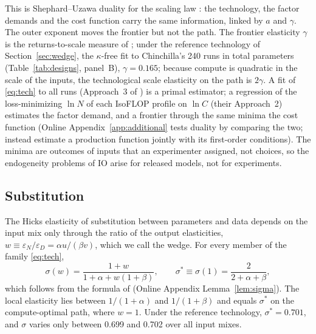 This is Shephard--Uzawa duality for the scaling law \citep{shephard1953cost,uzawa1964duality}: the technology, the
factor demands and the cost function carry the same information, linked by $a$ and $\gamma$. The outer exponent moves
the frontier but not the path. The frontier elasticity $\gamma$ is the returns-to-scale measure of
\citet{nerlove1963returns}; under the reference technology of Section~\ref{sec:wedge}, the $\kappa$-free fit to Chinchilla's 240 runs in
total parameters (Table~\ref{tab:designs}, panel~B), $\gamma=0.165$; because compute is quadratic in the scale of the
inputs, the technological scale elasticity on the path is $2\gamma$. A fit of \eqref{eq:tech} to all runs (Approach~3 of \citealp{hoffmann2022training}) is a
primal estimator; a regression of the loss-minimizing $\ln N$ of each IsoFLOP profile on $\ln C$ (their Approach~2)
estimates the factor demand, and a frontier through the same minima the cost function
(Online Appendix~\ref{app:additional} tests duality by comparing the two;
\citealp{klump2007factor} instead estimate a production function jointly with its first-order conditions). The minima are outcomes of inputs
that an experimenter assigned, not choices, so the endogeneity problems of IO arise for released models, not for
experiments.

\subsection{Substitution}\label{sec:framework:sigma}

The Hicks elasticity of substitution between parameters and data depends on the input mix only through the ratio of the
output elasticities, $w\equiv\varepsilon_N/\varepsilon_D=\alpha u/(\beta v)$, which we call the wedge. For every member
of the family \eqref{eq:tech},
\begin{equation}\label{eq:sigmaw}
\sigma(w)=\frac{1+w}{1+\alpha+w(1+\beta)},\qquad \sigma^*\equiv\sigma(1)=\frac{2}{2+\alpha+\beta},
\end{equation}
which follows from the formula of \citet{hao2026theory} (Online Appendix Lemma~\ref{lem:sigma}). The local elasticity
lies between $1/(1+\alpha)$ and $1/(1+\beta)$ and equals $\sigma^*$ on the compute-optimal path, where $w=1$. Under the
reference technology, $\sigma^*=0.701$, and $\sigma$ varies only between 0.699 and 0.702 over all input mixes.

